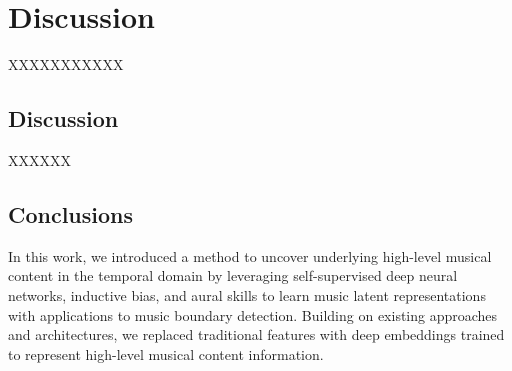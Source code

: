 \chapter{Discussion}

XXXXXXXXXXX

\section{Discussion}

XXXXXX

\section{Conclusions}

In this work, we introduced a method to uncover underlying high-level musical
content in the temporal domain by leveraging self-supervised deep neural networks, inductive bias, and aural skills to learn music latent representations with applications to music boundary detection. Building on existing approaches and architectures, we replaced traditional features with deep embeddings trained to represent high-level musical content information.

\newpage


